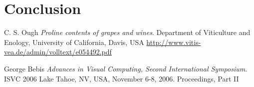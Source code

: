 \documentclass[10pt,twocolumn,letterpaper]{article}
\begin{document}
\section{Conclusion}

\begin{thebibliography}{9}
C. S. Ough
\textit{Proline contents of grapes and wines}. 
Department of Viticulture and Enology, University of California, Davis, USA
\url{http://www.vitis-vea.de/admin/volltext/e054492.pdf}

George Bebis
\textit{Advances in Visual Computing, Second International Symposium}.
ISVC 2006 Lake Tahoe, NV, USA, November 6-8, 2006. Proceedings, Part II 

\end{thebibliography}
\end{document}
